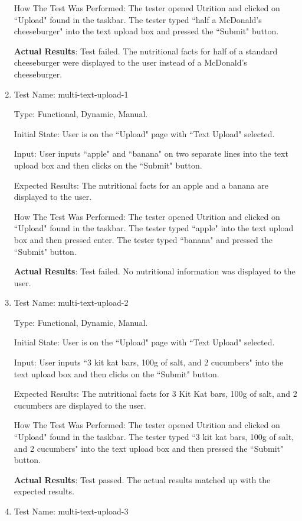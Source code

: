 \documentclass[12pt, titlepage]{article}
\begin{document}
\begin{enumerate}
		How The Test Was Performed: The tester opened Utrition and clicked on ``Upload" found in the taskbar. The tester typed ``half a McDonald's cheeseburger" into the text upload box and pressed the ``Submit" button.
		
		\textbf{Actual Results}: Test failed. The nutritional facts for half of a standard cheeseburger were displayed to the user instead of a McDonald's cheeseburger.
		
		\item{Test Name: multi-text-upload-1}
		
		Type: Functional, Dynamic, Manual.
		
		Initial State: User is on the ``Upload" page with ``Text Upload" selected.
		
		Input: User inputs ``apple" and ``banana" on two separate lines into the text upload box and then clicks on the ``Submit" button.
		
		Expected Results: The nutritional facts for an apple and a banana are displayed to the user.
		
		How The Test Was Performed: The tester opened Utrition and clicked on ``Upload" found in the taskbar. The tester typed ``apple" into the text upload box and then pressed enter. The tester typed ``banana" and pressed the ``Submit" button.
		
		\textbf{Actual Results}: Test failed. No nutritional information was displayed to the user.
		
		\item{Test Name: multi-text-upload-2}
		
		Type: Functional, Dynamic, Manual.
	
		Initial State: User is on the ``Upload" page with ``Text Upload" selected.
		
		Input: User inputs ``3 kit kat bars, 100g of salt, and 2 cucumbers" into the text upload box and then clicks on the ``Submit" button.
		
		Expected Results: The nutritional facts for 3 Kit Kat bars, 100g of salt, and 2 cucumbers are displayed to the user.
		
		How The Test Was Performed: The tester opened Utrition and clicked on ``Upload" found in the taskbar. The tester typed ``3 kit kat bars, 100g of salt, and 2 cucumbers" into the text upload box and then pressed the ``Submit" button.
		
		\textbf{Actual Results}: Test passed. The actual results matched up with the expected results.
		
		\item{Test Name: multi-text-upload-3}
		

\end{enumerate}
\end{document}
